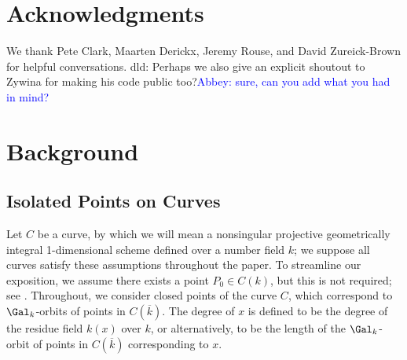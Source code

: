 \documentclass[11pt,reqno]{amsart}
\theoremstyle{plain}
\theoremstyle{definition}
\newcommand{\abbey}[1]{\textcolor{blue}{Abbey: #1}}
\newcommand{\dld}[1]{\textcolor{VioletRed}{dld: #1}}
\begin{document}
\section*{Acknowledgments}
We thank Pete Clark, Maarten Derickx, Jeremy Rouse, and David Zureick-Brown for helpful conversations.
\dld{Perhaps we also give an explicit shoutout to Zywina for making his code public too?}\abbey{sure, can you add what you had in mind?}

\section{Background}
\label{sec:background}
\subsection{Isolated Points on Curves}
Let $C$ be a curve, by which we will mean a nonsingular projective geometrically integral 1-dimensional scheme defined over a number field $k$; we suppose all curves satisfy these assumptions throughout the paper. To streamline our exposition, we assume there exists a point $P_0 \in C(k)$, but this is not required; see \cite[$\S4$]{BELOV}. Throughout, we consider closed points of the curve $C$, which correspond to $\Gal_k$-orbits of points in $C(\overline{k})$. The degree of $x$ is defined to be the degree of the residue field $k(x)$ over $k$, or alternatively, to be the length of the $\Gal_k$-orbit of points in $C(\overline{k})$ corresponding to $x$.
\end{document}
